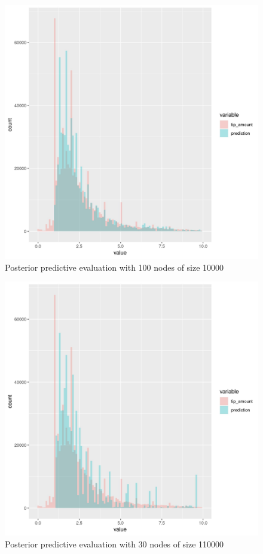 \documentclass[11pt]{article}
\begin{document}
\begin{figure}[htbp]
\centering
\includegraphics[width=.9\linewidth]{./plots/rfNodesize10000Maxnode100PosteriorPredictive.jpg}
\caption{\label{fig:org51b587d}
Posterior predictive evaluation with 100 nodes of size 10000}
\end{figure}

\begin{figure}[htbp]
\centering
\includegraphics[width=.9\linewidth]{./plots/rfNodesize110000Maxnode30PosteriorPredictive.jpg}
\caption{\label{fig:orgad93f36}
Posterior predictive evaluation with 30 nodes of size 110000}
\end{figure}
\end{document}
